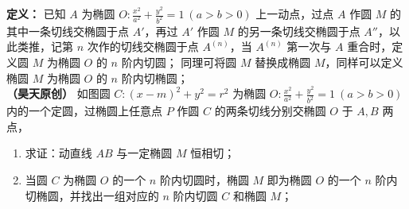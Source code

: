 \begin{exercise}
\noindent\textbf{定义：} 已知 \(A\) 为椭圆 \(O: \frac{x^2}{a^2} + \frac{y^2}{b^2} = 1\ (a > b > 0)\) 上一动点，过点 \(A\) 作圆 \(M\) 的其中一条切线交椭圆于点 \(A'\)，再过 \(A'\) 作圆 \(M\) 的另一条切线交椭圆于点 \(A''\)，以此类推，记第 \(n\) 次作的切线交椭圆于点 \(A^{(n)}\)，当 \(A^{(n)}\) 第一次与 \(A\) 重合时，定义圆 \(M\) 为椭圆 \(O\) 的 \(n\) 阶内切圆；
同理可将圆 \(M\) 替换成椭圆 \(M\)，同样可以定义椭圆 \(M\) 为椭圆 \(O\) 的 \(n\) 阶内切椭圆；\\
\noindent\textbf{（昊天原创）} 如图圆 \(C: (x - m)^2 + y^2 = r^2\) 为椭圆 \(O: \frac{x^2}{a^2} + \frac{y^2}{b^2} = 1\ (a > b > 0)\) 内的一个定圆，过椭圆上任意点 \(P\) 作圆 \(C\) 的两条切线分别交椭圆 \(O\) 于 \(A,B\) 两点，
\begin{enumerate}
    \item 求证：动直线 \(AB\) 与一定椭圆 \(M\) 恒相切；
    \item 当圆 \(C\) 为椭圆 \(O\) 的一个 \(n\) 阶内切圆时，椭圆 \(M\) 即为椭圆 \(O\) 的一个 \(n\) 阶内切椭圆，并找出一组对应的 \(n\) 阶内切圆 \(C\) 和椭圆 \(M\)；
\end{enumerate}
\end{exercise}
